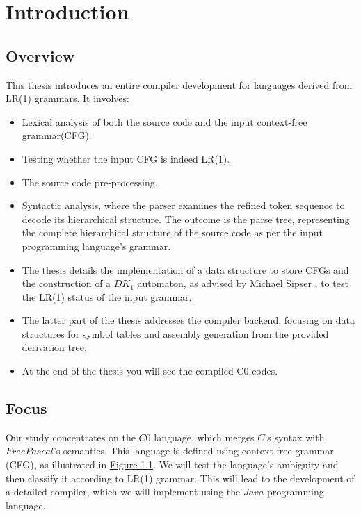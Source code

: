 \chapter{Introduction}\label{ch:Introduction}

\section*{Overview}
This thesis introduces an entire compiler development for languages derived from LR(1) grammars. It involves:

\begin{itemize}
    \item Lexical analysis of both the source code and the input context-free grammar(CFG).
    \item Testing whether the input CFG is indeed LR(1).
    \item The source code pre-processing.
    \item Syntactic analysis, where the parser examines the refined token sequence to decode its hierarchical structure. The outcome is the parse tree, representing the complete hierarchical structure of the source code as per the input programming language's grammar.
    \item The thesis details the implementation of a data structure to store CFGs and the construction of a \({DK_{1}}\) automaton, as advised by Michael Sipser \cite{sipser}, to test the LR(1) status of the input grammar.
    \item The latter part of the thesis addresses the compiler backend, focusing on data structures for symbol tables and assembly generation from the provided derivation tree.
    \item At the end of the thesis you will see the compiled C0 codes.
\end{itemize}

\section*{Focus}
Our study concentrates on the \(C0\) language, which merges \(C\)'s syntax with \(Free Pascal\)'s semantics. This language is defined using context-free grammar (CFG), as illustrated in \hyperref[fig:grammar_c0]{Figure 1.1}. We will test the language's ambiguity and then classify it according to LR(1) grammar. This will lead to the development of a detailed compiler, which we will implement using the \(Java\) programming language.

